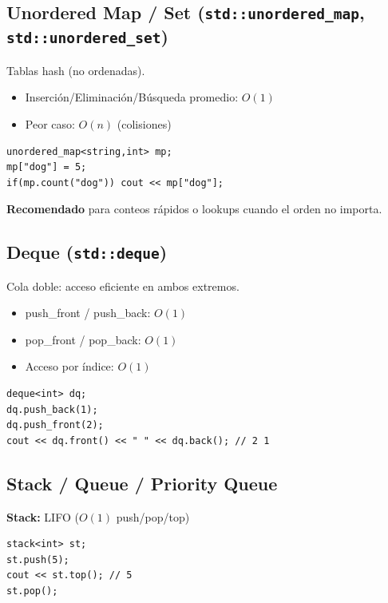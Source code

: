 \documentclass{article}
\begin{document}
\subsection{Unordered Map / Set (\texttt{std::unordered\_map}, \texttt{std::unordered\_set})}

Tablas hash (no ordenadas).

\begin{itemize}
  \item Inserción/Eliminación/Búsqueda promedio: \(O(1)\)
  \item Peor caso: \(O(n)\) (colisiones)
\end{itemize}

\begin{lstlisting}[style=cppstyle]
unordered_map<string,int> mp;
mp["dog"] = 5;
if(mp.count("dog")) cout << mp["dog"];
\end{lstlisting}

\textbf{Recomendado} para conteos rápidos o lookups cuando el orden no importa.


\subsection{Deque (\texttt{std::deque})}

Cola doble: acceso eficiente en ambos extremos.

\begin{itemize}
  \item push\_front / push\_back: \(O(1)\)
  \item pop\_front / pop\_back: \(O(1)\)
  \item Acceso por índice: \(O(1)\)
\end{itemize}

\begin{lstlisting}[style=cppstyle]
deque<int> dq;
dq.push_back(1);
dq.push_front(2);
cout << dq.front() << " " << dq.back(); // 2 1
\end{lstlisting}


\subsection{Stack / Queue / Priority Queue}

\textbf{Stack:} LIFO (\(O(1)\) push/pop/top)

\begin{lstlisting}[style=cppstyle]
stack<int> st;
st.push(5);
cout << st.top(); // 5
st.pop();
\end{lstlisting}
\end{document}

